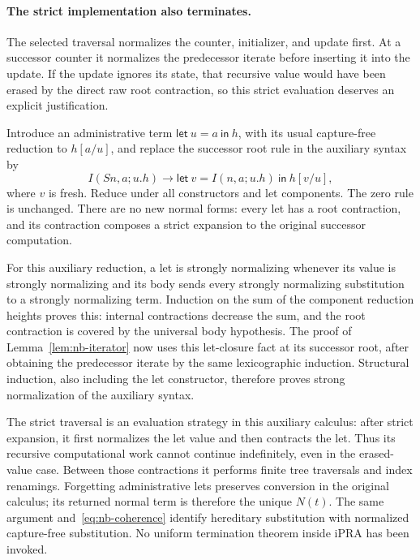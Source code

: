 \paragraph{The strict implementation also terminates.}
The selected traversal normalizes the counter, initializer, and update
first. At a successor counter it normalizes the predecessor iterate
before inserting it into the update. If the update ignores its state,
that recursive value would have been erased by the direct raw root
contraction, so this strict evaluation deserves an explicit justification.

Introduce an administrative term $\mathsf{let}\ u=a\ \mathsf{in}\ h$,
with its usual capture-free reduction to $h[a/u]$, and replace the
successor root rule in the auxiliary syntax by
\[
 I(Sn,a;u.h)\longrightarrow
       \mathsf{let}\ v=I(n,a;u.h)\ \mathsf{in}\ h[v/u],
 \tag{Strict expansion}
\]
where $v$ is fresh. Reduce under all constructors and let components.
The zero rule is unchanged. There are no new normal forms: every let
has a root contraction, and its contraction composes a strict expansion
to the original successor computation.

For this auxiliary reduction, a let is strongly normalizing whenever
its value is strongly normalizing and its body sends every strongly
normalizing substitution to a strongly normalizing term. Induction on
the sum of the component reduction heights proves this: internal
contractions decrease the sum, and the root contraction is covered by
the universal body hypothesis. The proof of
Lemma~\ref{lem:nb-iterator} now uses this let-closure fact at its successor
root, after obtaining the predecessor iterate by the same lexicographic
induction. Structural induction, also including the let constructor,
therefore proves strong normalization of the auxiliary syntax.

The strict traversal is an evaluation strategy in this auxiliary
calculus: after strict expansion, it first normalizes the let value and
then contracts the let. Thus its recursive computational work cannot
continue indefinitely, even in the erased-value case. Between those
contractions it performs finite tree traversals and index renamings.
Forgetting administrative lets preserves conversion in the original
calculus; its returned normal term is therefore the unique $N(t)$.
The same argument and~\eqref{eq:nb-coherence} identify hereditary
substitution with normalized capture-free substitution. No uniform
termination theorem inside iPRA has been invoked.


